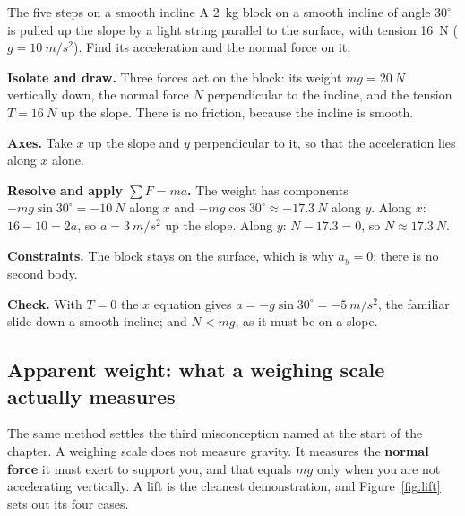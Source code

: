 \begin{exbox}{The five steps on a smooth incline}\label{ex:fbdincline}
A \SI{2}{kg} block on a smooth incline of angle $30^\circ$ is pulled up the slope by a light string
parallel to the surface, with tension \SI{16}{N} ($g=\SI{10}{m/s^2}$). Find its acceleration and the
normal force on it.

 \textbf{Isolate and draw.} Three forces act on the block: its weight $mg=\SI{20}{N}$ vertically
down, the normal force $N$ perpendicular to the incline, and the tension $T=\SI{16}{N}$ up the slope.
There is no friction, because the incline is smooth.

 \textbf{Axes.} Take $x$ up the slope and $y$ perpendicular to it, so that the acceleration lies
along $x$ alone.

 \textbf{Resolve and apply $\sum F=ma$.} The weight has components $-mg\sin30^\circ=\SI{-10}{N}$
along $x$ and $-mg\cos30^\circ\approx\SI{-17.3}{N}$ along $y$. Along $x$: $16-10=2a$, so
$a=\SI{3}{m/s^2}$ up the slope. Along $y$: $N-17.3=0$, so $N\approx\SI{17.3}{N}$.

 \textbf{Constraints.} The block stays on the surface, which is why $a_y=0$; there is no second
body.

 \textbf{Check.} With $T=0$ the $x$ equation gives $a=-g\sin30^\circ=\SI{-5}{m/s^2}$, the familiar
slide down a smooth incline; and $N<mg$, as it must be on a slope. 
\end{exbox}

\subsection{Apparent weight: what a weighing scale actually measures}

The same method settles the third misconception named at the start of the chapter.
A weighing scale does not measure gravity. It measures the \textbf{normal force} it must exert to
support you, and that equals $mg$ only when you are not accelerating vertically. A lift is the cleanest
demonstration, and Figure~\ref{fig:lift} sets out its four cases.

\begin{figure}[htbp]
\centering
{}
\end{figure}

